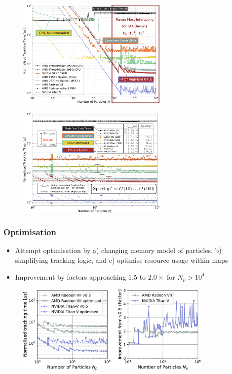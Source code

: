 \documentclass{beamer}
\begin{document}
\begin{frame}
{\begin{figure}[H]
        \end{figure}
    }
    {
        \begin{figure}[H]
            \centering
            \includegraphics[width=0.65\textwidth]{presentation_images/baseline_benchmark_overview_05}
        \end{figure}
    }
    {
        \begin{figure}[H]
            \centering
            \includegraphics[width=0.65\textwidth]{presentation_images/fig_benchmark_baseline_detail}
        \end{figure}
    }
\end{frame}

\begin{frame}
    \frametitle{Optimisation}
    \begin{itemize}
        \item Attempt optimisation by a) changing memory model of particles, b) simplifying tracking logic, and c) optimise resource
        usage within maps
        \item {\color{MyDarkRed}Improvement} by factors approaching $1.5$ to $2.0\times$ for $N_p > 10^4$
    \end{itemize}
    \begin{figure}[H]
        \centering
        \includegraphics[width=0.85\textwidth]{presentation_images/fig_performance_optimisation}
    \end{figure}
\end{frame}
\end{document}
